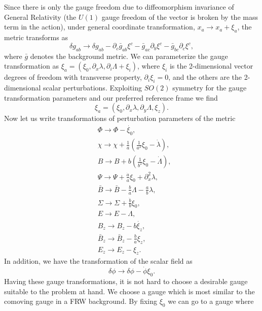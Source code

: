 \documentclass[%
 reprint,
 amsmath,amssymb,
 aps,
]{revtex4-1}
\begin{document}
Since there is only the gauge freedom due to diffeomorphism invariance of General Relativity (the $U(1)$ gauge freedom of the vector is broken by the mass term in the action), under general coordinate transformation, $x_a\rightarrow x_a+\xi_a$, the metric transforms as
\begin{equation}
\delta g_{ab}\rightarrow\delta g_{ab}-\partial_c\bar{g}_{ab}\xi^c-\bar{g}_{ac}\partial_b\xi^c-\bar{g}_{bc}\partial_c\xi^c,
\end{equation}
where $\bar{g}$ denotes the background metric. We can parameterize the gauge transformation as $\xi_a=(\xi_0,\partial_x\lambda,\partial_i\Lambda+\xi_i)$, where $\xi_i$ is the 2-dimensional vector degrees of freedom with transverse property, $\partial_i\xi_i=0$, and the others are the 2-dimensional scalar perturbations. Exploiting $SO(2)$ symmetry for the gauge transformation parameters and our preferred reference frame we find
\begin{equation}
\xi_a=(\xi_0,\partial_x \lambda,\partial_y \Lambda,\xi_z).
\end{equation}
Now let us write transformations of perturbation parameters of the metric
\begin{equation}
\begin{split}
&\Phi\rightarrow \Phi -\dot{\xi_0},\\
&\chi\rightarrow \chi+\frac{1}{a}(\frac{1}{a^2}\xi_0-\dot{\lambda}),\\
&B\rightarrow B+b(\frac{1}{b^2}\xi_0-\dot{\Lambda}),\\
&\Psi\rightarrow \Psi+\frac{\dot{a}}{a}\xi_0+\partial_x^2\lambda,\\
&\bar{B}\rightarrow \bar{B}-\frac{b}{a}\Lambda-\frac{a}{b}\lambda,\\
&\Sigma\rightarrow \Sigma +\frac{\dot{b}}{b}\xi_0,\\
&E\rightarrow E-\Lambda,\\
&B_z\rightarrow B_z-b\dot{\xi_z},\\
&\bar{B}_z\rightarrow \bar{B}_z-\frac{b}{a}\xi_z,\\
&E_z \rightarrow E_z-\xi_z.
\end{split}
\end{equation}
In addition, we have the transformation of the scalar field as
\begin{equation}
\delta\phi\rightarrow\delta\phi-\dot{\phi}\xi_0.
\end{equation}
Having these gauge transformations, it is not hard to choose a desirable gauge suitable to the problem at hand. We choose a gauge which is most similar to the comoving gauge in a FRW background. By fixing $\xi_0$ we can go to a gauge where
\end{document}
